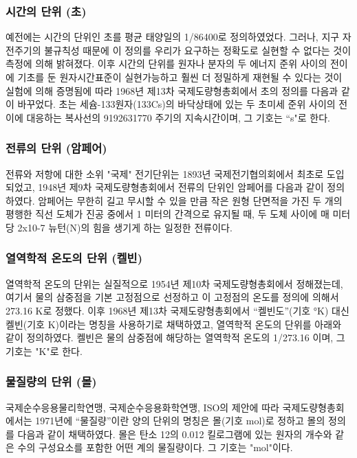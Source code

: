 \subsubsection{시간의 단위 (초)}
예전에는 시간의 단위인 초를 평균 태양일의 1/86400로 정의하였었다. 그러나, 지구 자전주기의 불규칙성 때문에 이 정의를 우리가 요구하는 정확도로 실현할 수 없다는 것이 측정에 의해 밝혀졌다. 이후 시간의 단위를 원자나 분자의 두 에너지 준위 사이의 전이에 기초를 둔 원자시간표준이 실현가능하고 훨씬 더 정밀하게 재현될 수 있다는 것이 실험에 의해 증명됨에 따라 1968년 제13차 국제도량형총회에서 초의 정의를 다음과 같이 바꾸었다. 초는 세슘-133원자(133Cs)의 바닥상태에 있는 두 초미세 준위 사이의 전이에 대응하는 복사선의 9192631770 주기의 지속시간이며, 그 기호는 “s"로 한다.

\subsubsection{전류의 단위 (암페어)}
전류와 저항에 대한 소위 "국제" 전기단위는 1893년 국제전기협의회에서 최초로 도입되었고, 1948년 제9차 국제도량형총회에서 전류의 단위인 암페어를 다음과 같이 정의하였다.
암페어는 무한히 길고 무시할 수 있을 만큼 작은 원형 단면적을 가진 두 개의 평행한 직선 도체가 진공 중에서 1 미터의 간격으로 유지될 때, 두 도체 사이에 매 미터 당 2x10-7 뉴턴(N)의 힘을 생기게 하는 일정한 전류이다.

\subsubsection{열역학적 온도의 단위 (켈빈)}
열역학적 온도의 단위는 실질적으로 1954년 제10차 국제도량형총회에서 정해졌는데, 여기서 물의 삼중점을 기본 고정점으로 선정하고 이 고정점의 온도를 정의에 의해서 273.16 K로 정했다. 이후 1968년 제13차 국제도량형총회에서 “켈빈도”(기호 °K) 대신 켈빈(기호 K)이라는 명칭을 사용하기로 채택하였고, 열역학적 온도의 단위를 아래와 같이 정의하였다. 켈빈은 물의 삼중점에 해당하는 열역학적 온도의 1/273.16 이며, 그 기호는 "K"로 한다.

\subsubsection{물질량의 단위 (몰)}
국제순수응용물리학연맹, 국제순수응용화학연맹, ISO의 제안에 따라 국제도량형총회에서는 1971년에 “물질량”이란 양의 단위의 명칭은 몰(기호 mol)로 정하고 몰의 정의를 다음과 같이 채택하였다.
몰은 탄소 12의 0.012 킬로그램에 있는 원자의 개수와 같은 수의 구성요소를 포함한 어떤 계의 물질량이다. 그 기호는 "mol"이다.

